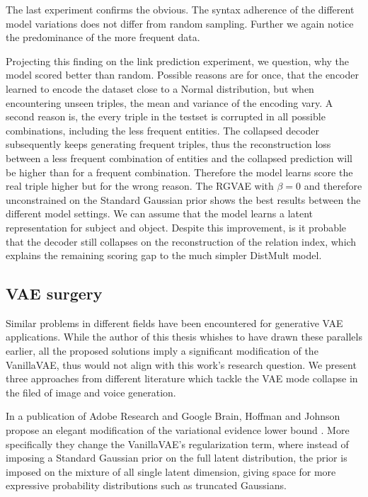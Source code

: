 The last experiment confirms the obvious. The syntax adherence of the different model variations does not differ from random sampling. Further we again notice the predominance of the more frequent data.


Projecting this finding on the link prediction experiment, we question, why the model scored better than random. Possible reasons are for once, that the encoder learned to encode the dataset close to a Normal distribution, but when encountering unseen triples, the mean and variance of the encoding vary. A second reason is, the every triple in the testset is corrupted in all possible combinations, including the less frequent entities. The collapsed decoder subsequently keeps generating frequent triples, thus the reconstruction loss between a less frequent combination of entities and the collapsed prediction will be higher than for a frequent combination. Therefore the model learns score the real triple higher but for the wrong reason. The RGVAE with $\beta = 0$ and therefore unconstrained on the Standard Gaussian prior shows the best results between the different model settings. We can assume that the model learns a latent representation for subject and object. Despite this improvement, is it probable that the decoder still collapses on the reconstruction of the relation index, which explains the remaining scoring gap to the much simpler DistMult model.


\subsection{VAE surgery}
\label{ssec7:solutions}

Similar problems in different fields have been encountered for generative VAE applications. While the author of this thesis whishes to have drawn these parallels earlier, all the proposed solutions imply a significant modification of the VanillaVAE, thus would not align with this work's research question. We present three approaches from different literature which tackle the VAE mode collapse in the filed of image and voice generation.

In a publication of Adobe Research and Google Brain, Hoffman and Johnson propose an elegant modification of the variational evidence lower bound \cite{hoffman2016elbo}. 
More specifically they change the VanillaVAE's regularization term, where instead of imposing a Standard Gaussian prior on the full latent distribution, the prior is imposed on the mixture of all single latent dimension, giving space for more expressive probability distributions such as truncated Gaussians. 

